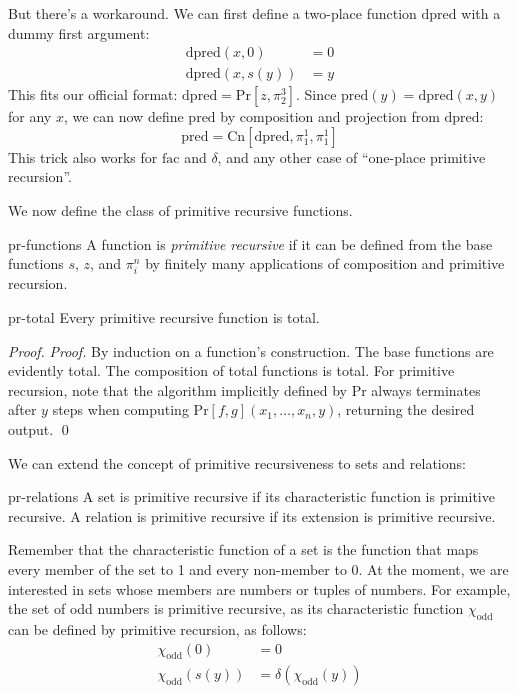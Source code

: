 But there's a workaround.
We can first define a two-place function $\mathrm{dpred}$
with a dummy first argument:
\begin{align*}
  \mathrm{dpred}(x,0) &= 0\\
  \mathrm{dpred}(x,s(y)) &= y
\end{align*}
This fits our official format:
$\mathrm{dpred} = \mathrm{Pr}[z, \pi^{3}_{2}]$.
Since $\mathrm{pred}(y) = \mathrm{dpred}(x, y)$ for any $x$,
we can now define $\mathrm{pred}$ by composition and projection from $\mathrm{dpred}$: 
\[
  \mathrm{pred} = \mathrm{Cn}[\mathrm{dpred}, \pi^{1}_{1}, \pi^{1}_{1}]
\]
This trick also works for $\mathrm{fac}$ and $\delta$,
and any other case of ``one-place primitive recursion''.

We now define the class of primitive recursive functions.

\begin{definition}{}{pr-functions}
  A function is \emph{primitive recursive} if
  it can be defined from the base functions $s$, $z$, and $\pi^{n}_{i}$ by finitely many applications of composition and primitive recursion.
\end{definition}

\begin{proposition}{}{pr-total}
  Every primitive recursive function is total.
\end{proposition}

\begin{proof}
  \emph{Proof.}
  By induction on a function's construction.
  The base functions are evidently total.
  The composition of total functions is total.
  For primitive recursion,
  note that the algorithm implicitly defined by $\mathrm{Pr}$
  always terminates after $y$ steps when computing $\mathrm{Pr}[f,g](x_1,\ldots,x_n,y)$,
  returning the desired output. \qed
\end{proof}

We can extend the concept of primitive recursiveness to sets and relations:

\begin{definition}{}{pr-relations}
  A set is primitive recursive if its characteristic function is primitive recursive.
  A relation is primitive recursive if its extension is primitive recursive.
\end{definition}

Remember that the characteristic function of a set is the function
that maps every member of the set to 1 and every non-member to 0.
At the moment,
we are interested in sets whose members are numbers or tuples of numbers.
For example,
the set of odd numbers is primitive recursive,
as its characteristic function $\chi_{\text{odd}}$ can be defined by primitive recursion, as follows:
\begin{align*}
  \chi_{\text{odd}}(0) &= 0\\
  \chi_{\text{odd}}(s(y)) &= \delta(\chi_{\text{odd}}(y))
\end{align*}

